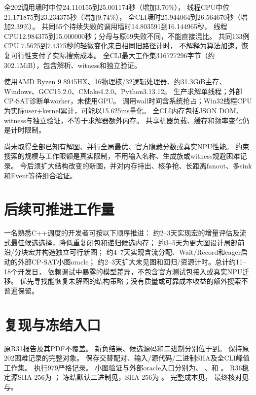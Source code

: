 \documentclass[UTF8,fontset=fandol,11pt]{ctexart}
\begin{document}
全202调用墙时中位24.110155到25.001174秒（增加3.70\%），
线程CPU中位21.171875到23.234375秒（增加9.74\%），
全CLI墙时25.944064到26.564670秒（增加2.39\%）。
共同65个持续失败的调用墙时14.803591到16.144965秒，
线程CPU12.984375到15.000000秒；分母与原69失败不同，不能直接混比。
共同133例CPU 7.5625到7.4375秒的轻微变化来自相同旧路径计时，
不解释为算法加速。恢复可行性支付了实际搜索成本。
全CLI最大工作集316727296字节（约302.1MiB），包含解析、witness和独立验证。

使用AMD Ryzen 9 8945HX、16物理核/32逻辑处理器、约31.3GiB主存、
Windows、GCC15.2.0、CMake4.2.0、Python3.13.12。
生产求解单线程；外部CP-SAT诊断单worker，未使用GPU。
调用wall时间含系统抢占；Win32线程CPU为实际user+kernel累计，可能以15.625ms量化。
全CLI内存包括JSON DOM、witness与独立验证，不等于求解器额外内存。
共享机器负载、缓存和频率变化仍是计时限制。

尚未取得全部已知有解图、并行全局最优、官方隐藏分数或真实NPU性能。
约束搜索的规模与工作限额是真实限制，不用输入名称、生成族或witness规避困难记录。
今后须扩大结构改变的新图，并对内存持出、核争抢、长距离fanout、多sink和Event等待组合验证。

\section{后续可推进工作量}
一名熟悉C++调度的开发者可按以下顺序推进：
约2--3天实现宏的增量评估及流式最佳候选选择，降低重复闭包和递归候选内存；
约3--5天为更大图设计局部前沿/分块宏并构造独立可行新图；
约4--7天实现含流分配、Wait/Record和eager启动的外部CP-SAT小图oracle；
约2--3天扩大未见图和回归/资源计时。总计约11--18个开发日，
依赖调试中暴露的模型差异，不包含官方测试包接入或真实NPU迁移。
优先寻找能恢复未解图的结构策略；没有质量或可靠成本收益的额外搜索不普遍保留。

\section{复现与冻结入口}
原R31报告及其PDF不覆盖。
新负结果、候选源码和二进制分别位于到。
保持原202困难记录的完整对象。
保存交替配对、输入/源代码/二进制SHA及全CLI峰值工作集。
执行979严格记录。
小图验证与外部oracle入口分别为、
、和
。
R36稳定源SHA-256为
；
冻结默认二进制见，SHA-256为
。
完整成本见，
最终核对见与。
\end{document}
